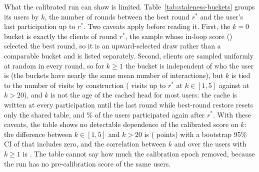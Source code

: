 What the calibrated run can show is limited. Table~\ref{tab:staleness-buckets} groups its
users by $k$, the number of rounds between the best round $r^\ast$ and the user's last
participation up to $r^\ast$. Two caveats apply before reading it. First, the $k=0$ bucket is
exactly the \ClientsPerRound{} clients of round $r^\ast$, the sample whose in-loop score
(\StaleInLoopAtBest) selected the best round, so it is an upward-selected draw rather than a
comparable bucket and is listed separately. Second, clients are sampled uniformly at random in
every round, so for $k\geq1$ the bucket is independent of who the user is (the buckets have
nearly the same mean number of interactions), but $k$ is tied to the number of visits by
construction (\StaleBucketOneFiveVisits{} visits up to $r^\ast$ at $k\in[1,5]$ against
\StaleBucketOverTwentyVisits{} at $k>20$), and $k$ is not the age of the cached head for most
users: the cache is written at every participation until the last round while best-round restore
resets only the shared table, and \StaleAfterBestPct\% of the users participated again after
$r^\ast$. With these caveats, the table shows no detectable dependence of the calibrated score
on $k$: the difference between $k\in[1,5]$ and $k>20$ is \StaleSpreadKOneDelta{}
(\StaleSpreadKOne{} points) with a bootstrap 95\% CI of \StaleSpreadKOneCi{} that includes
zero, and the correlation between $k$ and \ndcg{} over the users with $k\geq1$ is \StaleCorrKOne. The table cannot say how much the
calibration epoch removed, because the run has no pre-calibration score of the same users.

\begin{table}[htbp]
  \caption{\ndcg{} of the calibrated PFedRec run by $k$, the rounds between the best round and
  the user's last participation up to the best round. The $k=0$ bucket is the in-loop sample on
  which the best round was selected; \StaleAfterBestPct\% of the users participated again after
  the best round, so $k$ is not the age of their cached head. Interactions and visits are the
  bucket means; CI: percentile bootstrap of the mean, 10\,000 resamples.}
  \label{tab:staleness-buckets}
  \centering\small
  \fittable{}
\end{table}

